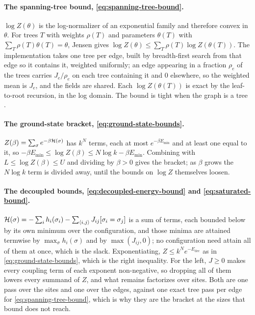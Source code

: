 \documentclass[11pt,a4paper]{article}
\begin{document}
\paragraph{The spanning-tree bound, \eqref{eq:spanning-tree-bound}.}
$\log Z(\theta)$ is the log-normalizer of an exponential family and therefore
convex in $\theta$. For trees $T$ with weights $\rho(T)$ and parameters
$\theta(T)$ with $\sum_T \rho(T)\theta(T) = \theta$, Jensen gives
$\log Z(\theta) \le \sum_T \rho(T) \log Z(\theta(T))$. The implementation
takes one tree per edge, built by breadth-first search from that edge so it
contains it, weighted uniformly; an edge appearing in a fraction $\rho_e$ of
the trees carries $J_e/\rho_e$ on each tree containing it and $0$ elsewhere,
so the weighted mean is $J_e$, and the fields are shared. Each
$\log Z(\theta(T))$ is exact by the leaf-to-root recursion, in the log
domain. The bound is tight when the graph is a tree \citep{wainwright2005}.

\paragraph{The ground-state bracket, \eqref{eq:ground-state-bounds}.}
$Z(\beta) = \sum_\sigma e^{-\beta \mathcal{H}(\sigma)}$ has $k^N$ terms, each at
most $e^{-\beta E_{\min}}$ and at least one equal to it, so
$-\beta E_{\min} \le \log Z(\beta) \le N \log k - \beta E_{\min}$. Combining
with $L \le \log Z(\beta) \le U$ and dividing by $\beta > 0$ gives the
bracket; as $\beta$ grows the $N \log k$ term is divided away, until the
bounds on $\log Z$ themselves loosen.

\paragraph{The decoupled bounds, \eqref{eq:decoupled-energy-bound} and
\eqref{eq:saturated-bound}.}
$\mathcal{H}(\sigma) = -\sum_i h_i(\sigma_i) - \sum_{\langle i,j \rangle} J_{ij}
[\sigma_i = \sigma_j]$ is a sum of terms, each bounded below by its own
minimum over the configuration, and those minima are attained termwise by
$\max_\sigma h_i(\sigma)$ and by $\max(J_{ij}, 0)$; no configuration need
attain all of them at once, which is the slack. Exponentiating,
$Z \le k^N e^{-E_{\mathrm{dec}}}$ as in \eqref{eq:ground-state-bounds}, which
is the right inequality. For the left, $J \ge 0$ makes every coupling term of
each exponent non-negative, so dropping all of them lowers every summand of
$Z$, and what remains factorizes over sites. Both are one pass over the sites
and one over the edges, against one exact tree pass per edge for
\eqref{eq:spanning-tree-bound}, which is why they are the bracket at the
sizes that bound does not reach.
\end{document}
